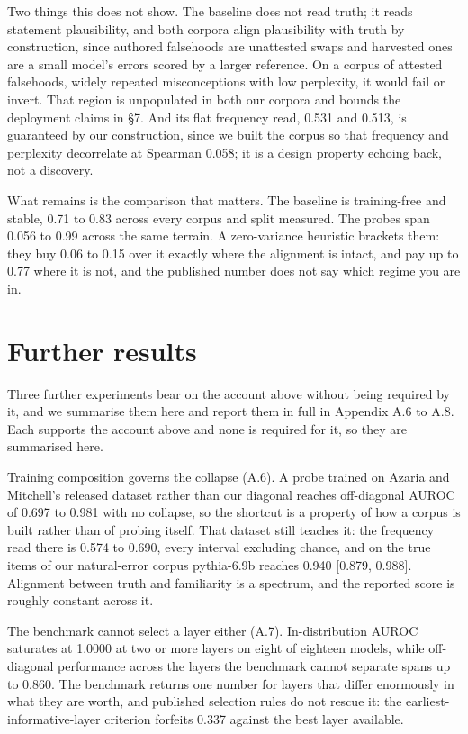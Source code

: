 \documentclass[10pt]{article}
\begin{document}
Two things this does not show. The baseline does not read truth; it reads statement plausibility, and both corpora align plausibility with truth by construction, since authored falsehoods are unattested swaps and harvested ones are a small model's errors scored by a larger reference. On a corpus of attested falsehoods, widely repeated misconceptions with low perplexity, it would fail or invert. That region is unpopulated in both our corpora and bounds the deployment claims in §7. And its flat frequency read, 0.531 and 0.513, is guaranteed by our construction, since we built the corpus so that frequency and perplexity decorrelate at Spearman 0.058; it is a design property echoing back, not a discovery.

What remains is the comparison that matters. The baseline is training-free and stable, 0.71 to 0.83 across every corpus and split measured. The probes span 0.056 to 0.99 across the same terrain. A zero-variance heuristic brackets them: they buy 0.06 to 0.15 over it exactly where the alignment is intact, and pay up to 0.77 where it is not, and the published number does not say which regime you are in.

\section{Further results}

Three further experiments bear on the account above without being required by it, and we summarise them here and report them in full in Appendix A.6 to A.8. Each supports the account above and none is required for it, so they are summarised here.

Training composition governs the collapse (A.6). A probe trained on Azaria and Mitchell's released dataset rather than our diagonal reaches off-diagonal AUROC of 0.697 to 0.981 with no collapse, so the shortcut is a property of how a corpus is built rather than of probing itself. That dataset still teaches it: the frequency read there is 0.574 to 0.690, every interval excluding chance, and on the true items of our natural-error corpus pythia-6.9b reaches 0.940 [0.879, 0.988]. Alignment between truth and familiarity is a spectrum, and the reported score is roughly constant across it.

The benchmark cannot select a layer either (A.7). In-distribution AUROC saturates at 1.0000 at two or more layers on eight of eighteen models, while off-diagonal performance across the layers the benchmark cannot separate spans up to 0.860. The benchmark returns one number for layers that differ enormously in what they are worth, and published selection rules do not rescue it: the earliest-informative-layer criterion forfeits 0.337 against the best layer available.
\end{document}
